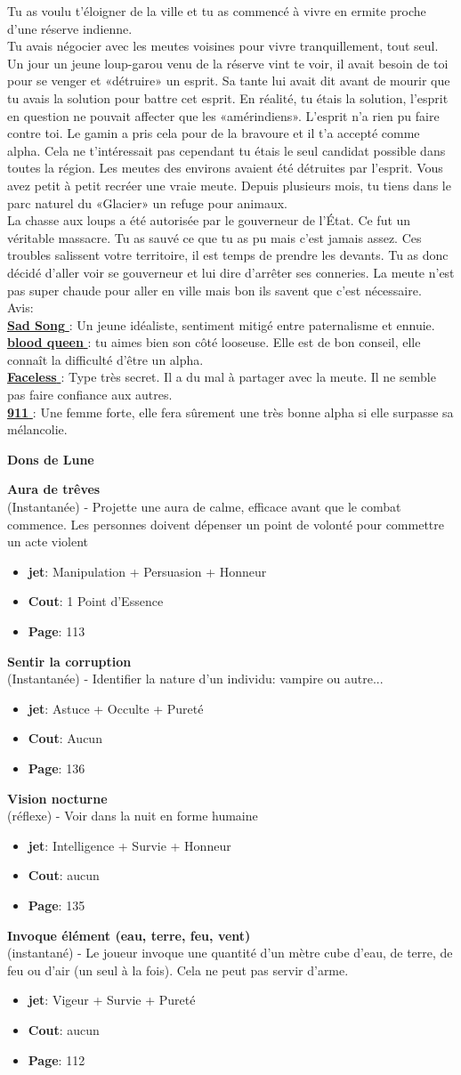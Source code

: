 \documentclass[oneside,12pt]{book}
\newcommand\don[6]{
\textbf{#1} \\
(#6) - #2
\begin{itemize}
\item{ \textbf{jet}: #3}
\item{ \textbf{Cout}: #4}
\item{ \textbf{Page}: #5}
\end{itemize}
\vspace{0.5cm}
}
\newcommand{\Mathew}{\textbf{Sad Song} }
\newcommand{\Laura}{\textbf{blood queen} }
\newcommand{\Andy}{\textbf{Faceless} }
\newcommand{\Kelly}{\textbf{911} }
\begin{document}
\begin{flushleft}
\begin{description}
{Tu as voulu t’éloigner de la ville et tu as commencé à vivre en ermite proche d'une réserve indienne. \\
Tu avais négocier avec les meutes voisines pour vivre tranquillement, tout seul. Un jour un jeune loup-garou venu de la réserve vint te voir, il avait besoin de toi pour se venger et «détruire» un esprit. Sa tante lui avait dit avant de mourir que tu avais la solution pour battre cet esprit. En réalité, tu étais la solution, l’esprit en question ne pouvait affecter que les «amérindiens». L'esprit n'a rien pu faire contre toi. Le gamin a pris cela pour de la bravoure et il t’a accepté comme alpha. Cela ne t’intéressait pas cependant tu étais le seul candidat possible dans toutes la région. Les meutes des environs avaient été détruites par l’esprit.
Vous avez petit à petit recréer une vraie meute. 
Depuis plusieurs mois, tu tiens dans le parc naturel du «Glacier» un refuge pour animaux. \\
La chasse aux loups a été autorisée par le gouverneur de l’État. Ce fut un véritable massacre. Tu as sauvé ce que tu as pu mais c'est jamais assez. Ces troubles salissent votre territoire, il est temps de prendre les devants. Tu as donc décidé d'aller voir se gouverneur et lui dire d’arrêter ses conneries. La meute n’est pas super chaude pour aller en ville mais bon ils savent que c’est nécessaire. \\

Avis:\\
\underline{\Mathew} : Un jeune idéaliste, sentiment mitigé entre paternalisme et ennuie.\\
\underline{\Laura} : tu aimes bien son côté looseuse. Elle est de bon conseil, elle connaît la difficulté d'être un alpha.  \\
\underline{\Andy} : Type très secret. Il a du mal à partager avec la meute. Il ne semble pas faire confiance aux autres. \\
\underline{\Kelly} : Une femme forte, elle fera sûrement une très bonne alpha si elle surpasse sa mélancolie. \\
}
\end{description}
\clearpage
\textbf{\large Dons de Lune} \\
\vspace{0.5cm}
\don{Aura de trêves}{Projette une aura de calme, efficace avant que le combat commence. Les personnes doivent dépenser un point de volonté pour commettre un acte violent}{Manipulation + Persuasion + Honneur}{1 Point d’Essence}{113}{Instantanée}
\don{Sentir la corruption}{Identifier la nature d'un individu: vampire ou autre...}{Astuce + Occulte + Pureté}{Aucun}{136}{Instantanée}
\don{Vision nocturne}{Voir dans la nuit en forme humaine}{Intelligence + Survie + Honneur}{aucun}{135}{réflexe}
\don{Invoque élément (eau, terre, feu, vent)}{Le joueur invoque une quantité d’un mètre cube d’eau, de terre, de feu ou d’air (un seul à la fois). Cela ne peut pas servir d’arme.}{Vigeur + Survie + Pureté}{aucun}{112}{instantané}


\end{flushleft}
\end{document}
